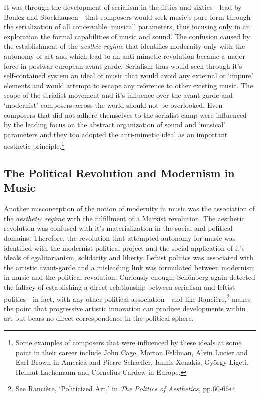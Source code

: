 It was through the development of serialism in the fifties and sixties---lead by Boulez and Stockhausen---that composers would seek music's pure form through the serialization of all conceivable `musical' parameters, thus focusing only in an exploration the formal capabilities of music and sound. The confusion caused by the establishment of the \emph{aesthic regime} that identifies modernity only with the autonomy of art and which lead to an anti-mimetic revolution became a major force in postwar european avant-garde. Serialism thus would seek through it's self-contained system an ideal of music that would avoid any external or `impure' elements and would attempt to escape any reference to other existing music. The scope of the serialist movement and it's influence over the avant-garde and `modernist' composers across the world should not be overlooked. Even composers that did not adhere themselves to the serialist camp were influenced by the leading focus on the abstract organization of sound and `musical' parameters and they too adopted the anti-mimetic ideal as an important aesthetic principle.\footnote{Some examples of composers that were influenced by these ideals at some point in their career include John Cage, Morton Feldman, Alvin Lucier and Earl Brown in America and Pierre Schaeffer, Iannis Xenakis, Gy\"{o}rgy Ligeti, Helmut Lachemann and Cornelius Cardew in Europe.}

\subsection{The Political Revolution and Modernism in Music}

Another misconception of the notion of modernity in music was the association of the \emph{aesthetic regime} with the fulfillment of a Marxist revolution. The aesthetic revolution was confused with it's materialization in the social and political domains. Therefore, the revolution that attempted autonomy for music was identified with the modernist political project and the social application of it's ideals of egalitarianism, solidarity and liberty.
Leftist politics was associated with the artistic avant-garde and a misleading link was formulated between modernism in music and the political revolution. Curiously enough, Sch\"{o}nberg again detected the fallacy of establishing a direct relationship between serialism and leftist politics---in fact, with any other political association---and like Ranci\`{e}re,\footnote{See Ranci\`{e}re, `Politicized Art,' in \emph{The Politics of Aesthetics}, pp.60-66} makes the point that progressive artistic innovation can produce developments within art but bears no direct correspondence in the political sphere.

